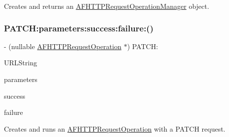 Creates and returns an {\ttfamily \mbox{\hyperlink{interface_a_f_h_t_t_p_request_operation_manager}{A\+F\+H\+T\+T\+P\+Request\+Operation\+Manager}}} object. \mbox{\label{interface_a_f_h_t_t_p_request_operation_manager_a45781bd7d5d3ac10da2692964a5eb990}} 
\subsubsection{\texorpdfstring{P\+A\+T\+C\+H\+:parameters\+:success\+:failure\+:()}{PATCH:parameters:success:failure:()}\hspace{0.1cm}{\footnotesize\ttfamily [1/3]}}
{\footnotesize\ttfamily -\/ (nullable \mbox{\hyperlink{interface_a_f_h_t_t_p_request_operation}{A\+F\+H\+T\+T\+P\+Request\+Operation}} $\ast$) P\+A\+T\+C\+H\+: \begin{DoxyParamCaption}\item[{(N\+S\+String $\ast$)}]{U\+R\+L\+String }\item[{parameters:(nullable id)}]{parameters }\item[{success:(nullable void($^\wedge$)(\mbox{\hyperlink{interface_a_f_h_t_t_p_request_operation}{A\+F\+H\+T\+T\+P\+Request\+Operation}} $\ast$operation, id response\+Object))}]{success }\item[{failure:(nullable void($^\wedge$)(\mbox{\hyperlink{interface_a_f_h_t_t_p_request_operation}{A\+F\+H\+T\+T\+P\+Request\+Operation}} $\ast$\+\_\+\+\_\+nullable operation, N\+S\+Error $\ast$error))}]{failure }\end{DoxyParamCaption}}

Creates and runs an {\ttfamily \mbox{\hyperlink{interface_a_f_h_t_t_p_request_operation}{A\+F\+H\+T\+T\+P\+Request\+Operation}}} with a {\ttfamily P\+A\+T\+CH} request.


